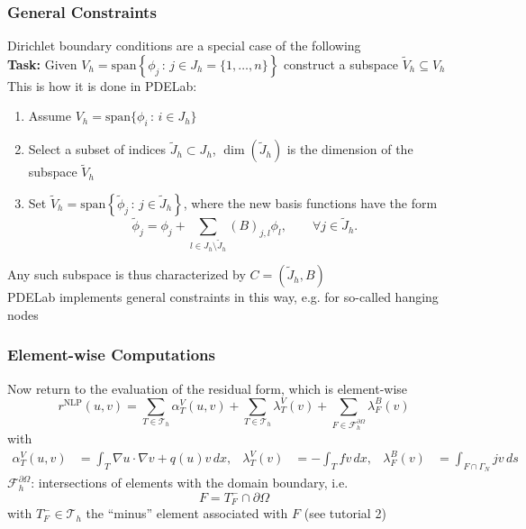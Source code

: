 \documentclass[aspectratio=169,11pt]{beamer}
\theoremstyle{definition}
\begin{document}
\begin{frame}
\frametitle{General Constraints}
Dirichlet boundary conditions are a special case of the following\\
\bigskip
\textbf{Task:} Given $V_h = \text{span}\left\{\phi_j \,:\, j\in J_h=\{1,\ldots,n\}\right\}$
construct a subspace $\tilde{V}_h\subseteq V_h$\\
\bigskip
This is how it is done in PDELab:
\begin{enumerate}[1)]
\item Assume $V_h=\text{span}\{\phi_i \,:\, i\in J_h\}$
\item Select a subset of indices $\tilde{J}_h\subset J_h$, $\dim(\tilde{J}_h)$ is the dimension of the subspace $\tilde V_h$
\item Set $\tilde{V}_h = \text{span}\left\{\tilde\phi_j \,:\, j\in \tilde{J}_h\right\}$,
where the new basis functions have the form
\begin{equation*}
\tilde\phi_j = \phi_j + \sum_{l\in J_h\setminus\tilde{J}_h} (B)_{j,l} \phi_l, \qquad \forall j\in \tilde{J}_h.
\end{equation*}
\end{enumerate}
Any such subspace is thus characterized by $C=(\tilde{J}_h,B)$\\
PDELab implements general constraints in this way, e.g. for so-called hanging nodes
\end{frame}

\begin{frame}
\frametitle{Element-wise Computations}
Now return to the evaluation of the residual form, which is element-wise
\begin{equation*}
r^{\text{NLP}}\left(u,v\right) =
\sum_{T\in\mathcal{T}_h} \alpha_T^V(u,v)
  + \sum_{T\in\mathcal{T}_h} \lambda_T^V(v)
 + \sum_{F\in\mathcal{F}_h^{\partial\Omega}}\lambda_F^B(v)
\end{equation*}
with
\begin{align*}
\alpha_T^V(u,v) &= \int_T \nabla u \cdot \nabla v + q(u) v \,dx, &
\lambda_T^V(v) &= - \int_T f v \,dx, & 
\lambda_F^B(v) &= \int_{F\cap\Gamma_N} j v\,ds
\end{align*}
$\mathcal{F}_h^{\partial\Omega}$: intersections of
elements with the domain boundary, i.e.
$$F=T_F^-\cap\partial\Omega$$
with $T_F^-\in\mathcal{T}_h$ the ``minus'' element associated with $F$ (see tutorial 2)
\end{frame}
\end{document}
